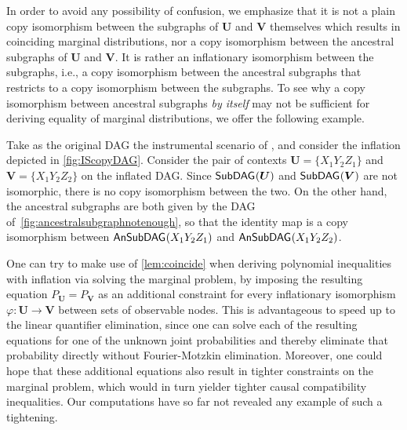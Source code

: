 \documentclass[aps,english,superscriptaddress,onecolumn,twoside,longbibliography,pra,floatfix,fleqn,nofootinbib]{revtex4-1}%
\theoremstyle{definition}
\newcommand{\SmallNamedFunction}[3][]{\operatorname{\mathsf{#2}}_{#1}\parenths{#3}}
\newcommand{\subgraph}[2][]{\SmallNamedFunction[#1]{SubDAG}{#2}}
\newcommand{\ansubgraph}[2][]{\SmallNamedFunction[#1]{AnSubDAG}{#2}}
\DeclarePairedDelimiter{\parenths}{\lparen}{\rparen}
\begin{document}
In order to avoid any possibility of confusion, we emphasize that it is not a plain copy isomorphism between the subgraphs of $\bm{U}$ and $\bm{V}$ themselves which results in coinciding marginal distributions, nor a copy isomorphism between the ancestral subgraphs of $\bm{U}$ and $\bm{V}$. It is rather an inflationary isomorphism between the subgraphs, i.e., a copy isomorphism between the ancestral subgraphs that restricts to a copy isomorphism between the subgraphs. To see why a copy isomorphism between ancestral subgraphs {\em by itself} may not be sufficient for deriving equality of marginal distributions, we offer the following example.

Take as the original DAG the instrumental scenario of \citet{pearl1995instrumental}, and consider the inflation depicted in \cref{fig:IScopyDAG}.  Consider the pair of contexts $\bm{U} = \{ X_1 Y_2 Z_1\}$ and $\bm{V}= \{ X_1 Y_2 Z_2\}$ on the inflated DAG. Since $\subgraph{\bm{U}}$ and $\subgraph{\bm{V}}$ are not isomorphic, there is no copy isomorphism between the two. On the other hand, 
the ancestral subgraphs are both given by the DAG of~\cref{fig:ancestralsubgraphnotenough}, so that the identity map is a copy isomorphism between $\ansubgraph{X_1 Y_2 Z_1}$ and $\ansubgraph{X_1 Y_2 Z_2}$.

One can try to make use of \cref{lem:coincide} when deriving polynomial inequalities with inflation via solving the marginal problem, by imposing the resulting equation $P_{\bm{U}} = P_{\bm{V}}$ as an additional constraint for every inflationary isomorphism $\varphi : \bm{U}\to\bm{V}$ between sets of observable nodes. This is advantageous to speed up to the linear quantifier elimination, since one can solve each of the resulting equations for one of the unknown joint probabilities and thereby eliminate that probability directly without Fourier-Motzkin elimination. Moreover, one could hope that these additional equations also result in tighter constraints on the marginal problem, which would in turn yielder tighter causal compatibility inequalities. Our computations have so far not revealed any example of such a tightening.
\end{document}

